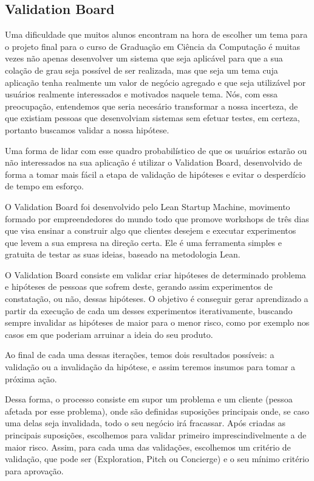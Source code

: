 \subsection{Validation Board}\label{sec:LABEL_CHP_1_SEC_B}
Uma dificuldade que muitos alunos encontram na hora de escolher um tema para o projeto final para o curso de Graduação em Ciência da Computação é muitas vezes não apenas desenvolver um sistema que seja aplicável para que a sua colação de grau seja possível de ser realizada, mas que seja um tema cuja aplicação tenha realmente um valor de negócio agregado e que seja utilizável por usuários realmente interessados e motivados naquele tema. Nós, com essa preocupação, entendemos que seria necesário transformar a nossa incerteza, de que existiam pessoas que desenvolviam sistemas sem efetuar testes, em certeza, portanto buscamos validar a nossa hipótese.

Uma forma de lidar com esse quadro probabilístico de que os usuários estarão ou não interessados na sua aplicação é utilizar o Validation Board, desenvolvido de forma a tomar mais fácil a etapa de validação de hipóteses e evitar o desperdício de tempo em esforço.

O Validation Board foi desenvolvido pelo Lean Startup Machine, movimento formado por empreendedores do mundo todo que promove workshops de três dias que visa ensinar a construir algo que clientes desejem e executar experimentos que levem a sua empresa na direção certa. Ele é uma ferramenta simples e gratuita de testar as suas ideias, baseado na metodologia Lean.

O Validation Board consiste em validar criar hipóteses de determinado problema e hipóteses de pessoas que sofrem deste, gerando assim experimentos de constatação, ou não, dessas hipóteses. O objetivo é conseguir gerar aprendizado a partir da execução de cada um desses experimentos iterativamente, buscando sempre invalidar as hipóteses de maior para o menor risco, como por exemplo nos casos em que poderiam arruinar a ideia do seu produto.

Ao final de cada uma dessas iterações, temos dois resultados possíveis: a validação ou a invalidação da hipótese, e assim teremos insumos para tomar a próxima ação.

Dessa forma, o processo consiste em supor um problema e um cliente (pessoa afetada por esse problema), onde são definidas suposições principais onde, se caso uma delas seja invalidada, todo o seu negócio irá fracassar. Após criadas as principais suposições, escolhemos para validar primeiro imprescindivelmente a de maior risco. Assim, para cada uma das validações, escolhemos um critério de validação, que pode ser (Exploration, Pitch ou Concierge) e o seu mínimo critério para aprovação.

